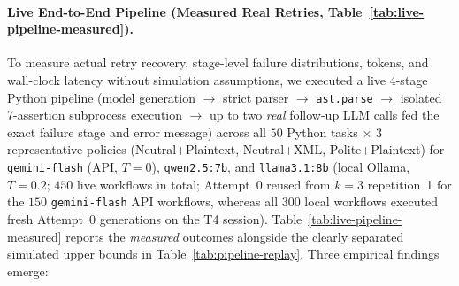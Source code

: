 \documentclass[a4paper,fleqn]{cas-sc}
\begin{document}
\paragraph{Live End-to-End Pipeline (Measured Real Retries, Table~\ref{tab:live-pipeline-measured}).}
To measure actual retry recovery, stage-level failure distributions, tokens, and wall-clock latency without simulation assumptions, we executed a live 4-stage Python pipeline (model generation $\to$ strict parser $\to$ \texttt{ast.parse} $\to$ isolated 7-assertion subprocess execution $\to$ up to two \emph{real} follow-up LLM calls fed the exact failure stage and error message) across all $50$ Python tasks $\times$ $3$ representative policies (Neutral+Plaintext, Neutral+XML, Polite+Plaintext) for \texttt{gemini-flash} (API, $T = 0$), \texttt{qwen2.5:7b}, and \texttt{llama3.1:8b} (local Ollama, $T = 0.2$; $450$ live workflows in total; Attempt~0 reused from $k = 3$ repetition~1 for the $150$ \texttt{gemini-flash} API workflows, whereas all $300$ local workflows executed fresh Attempt~0 generations on the T4 session). Table~\ref{tab:live-pipeline-measured} reports the \emph{measured} outcomes alongside the clearly separated simulated upper bounds in Table~\ref{tab:pipeline-replay}. Three empirical findings emerge:
\end{document}

